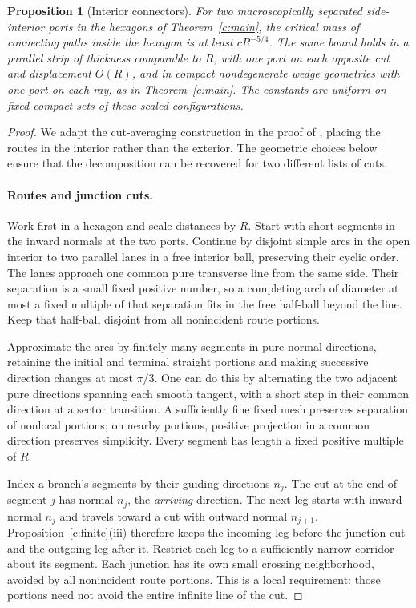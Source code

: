 \documentclass[11pt]{article}
\numberwithin{equation}{section}
\newtheorem{proposition}[theorem]{Proposition}
\theoremstyle{definition}\newtheorem{definition}[theorem]{Definition}
\theoremstyle{remark}\newtheorem{remark}[theorem]{Remark}
\begin{document}
\begin{proposition}[Interior connectors]\label{c:connectors}
For two macroscopically separated side-interior ports in the hexagons of
Theorem~\ref{c:main}, the critical mass of connecting paths inside the
hexagon is at least $cR^{-5/4}$. The same bound holds in a parallel strip
of thickness comparable to $R$, with one port on each opposite cut and
displacement $O(R)$, and in compact nondegenerate wedge geometries with
one port on each ray, as in Theorem~\ref{c:main}. The constants are uniform
on fixed compact sets of these scaled configurations.
\end{proposition}
\begin{proof}
We adapt the cut-averaging construction in the proof of
\cite[Proposition 10.2]{UniformMarked}, placing the routes in the interior
rather than the exterior. The geometric choices below ensure that the
decomposition can be recovered for two different lists of cuts.

\paragraph{Routes and junction cuts.}
Work first in a hexagon and scale distances by $R$. Start with short
segments in the inward normals at the two ports. Continue by disjoint
simple arcs in the open interior to two parallel lanes in a free interior
ball, preserving their cyclic order. The lanes approach one common pure
transverse line from the same side. Their separation is a small fixed
positive number, so a completing arch of diameter at most a fixed
multiple of that separation fits in the free half-ball beyond the line.
Keep that half-ball disjoint from all nonincident route portions.

Approximate the arcs by finitely many segments in pure normal directions,
retaining the initial and terminal straight portions and making successive
direction changes at most $\pi/3$. One can do this by alternating the two
adjacent pure directions spanning each smooth tangent, with a short step
in their common direction at a sector transition. A sufficiently fine
fixed mesh preserves separation of nonlocal portions; on nearby portions,
positive projection in a common direction preserves simplicity. Every
segment has length a fixed positive multiple of $R$.

Index a branch's segments by their guiding directions $n_j$. The cut at
the end of segment $j$ has normal $n_j$, the \emph{arriving} direction.
The next leg starts with inward normal $n_j$ and travels toward a cut
with outward normal $n_{j+1}$. Proposition~\ref{c:finite}(iii) therefore
keeps the incoming leg before the junction cut and the outgoing leg
after it. Restrict each leg to a sufficiently narrow corridor about its
segment. Each junction has its own small crossing neighborhood, avoided
by all nonincident route portions. This is a local requirement: those
portions need not avoid the entire infinite line of the cut.


\end{proof}
\end{document}
